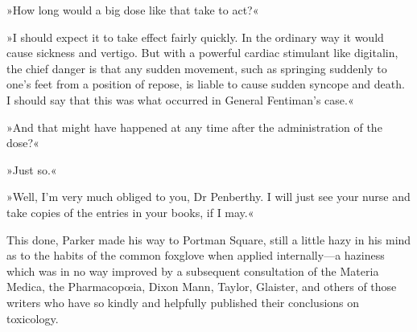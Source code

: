»How long would a big dose like that take to act?«

»I should expect it to take effect fairly quickly. In the ordinary way it would cause sickness and vertigo. But with a powerful cardiac stimulant like digitalin, the chief danger is that any sudden movement, such as springing suddenly to one's feet from a position of repose, is liable to cause sudden syncope and death. I should say that this was what occurred in General Fentiman's case.«

»And that might have happened at any time after the administration of the dose?«

»Just so.«

»Well, I'm very much obliged to you, Dr Penberthy. I will just see your nurse and take copies of the entries in your books, if I may.«

This done, Parker made his way to Portman Square, still a little hazy in his mind as to the habits of the common foxglove when applied internally\allowbreak---\allowbreak a haziness which was in no way improved by a subsequent consultation of the Materia Medica, the Pharmacopœia, Dixon Mann, Taylor, Glaister, and others of those writers who have so kindly and helpfully published their conclusions on toxicology.